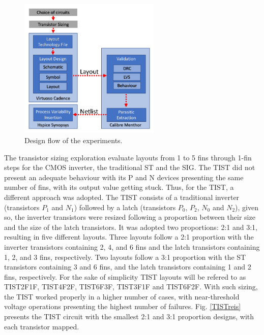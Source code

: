 \documentclass[diss,pgmicro,english]{iiufrgs}
\begin{document}
\begin{figure}[]
\centering
\includegraphics[width=0.6\textwidth, trim={0cm 0cm 0cm 0cm},clip]{designFlow.pdf}
\caption{Design flow of the experiments.}
\label{DesignFlow}
\end{figure}

The transistor sizing exploration evaluate layouts from 1 to 5 fins through 1-fin steps for the CMOS inverter, the traditional ST and the SIG. The TIST did not present an adequate behaviour with its P and N devices presenting the same number of fins, with its output value getting stuck. Thus, for the TIST, a different approach was adopted. The TIST consists of a traditional inverter (transistors $P_1$ and $N_1$) followed by a latch (transistors $P_0$, $P_2$, $N_0$ and $N_2$), given so, the inverter transistors were resized following a proportion between their size and the size of the latch transistors. It was adopted two proportions: 2:1 and 3:1, resulting in five different layouts. Three layouts follow a 2:1 proportion with the inverter transistors containing 2, 4, and 6 fins and the latch transistors containing 1, 2, and 3 fins, respectively. Two layouts follow a 3:1 proportion with the ST transistors containing 3 and 6 fins, and the latch transistors containing 1 and 2 fins, respectively. For the sake of simplicity TIST layouts will be refered to as TIST2F1F, TIST4F2F, TIST6F3F, TIST3F1F and TIST6F2F. With such sizing, the TIST worked properly in a higher number of cases, with near-threshold voltage operations presenting the highest number of failures. Fig. \ref{TISTreis} presents the TIST circuit with the smallest 2:1 and 3:1 proportion designs, with each transistor mapped.
\end{document}
